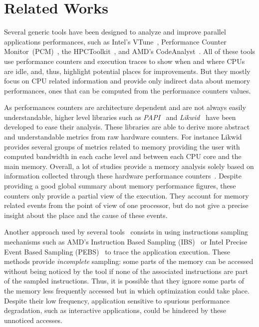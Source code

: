 
\section{Related Works}
\label{sec:related}

Several generic tools have been designed to analyze and improve parallel
applications performances, such as Intel's VTune~\cite{Reinders05VTune},
Performance Counter Monitor~(PCM)~\cite{Intel2012b}, the
HPCToolkit~\cite{Adhianto10HPCTOOLKIT}, and AMD's
CodeAnalyst~\cite{Drongowski2008}. All of these tools use performance
counters and execution traces to show when and where CPUs are idle, and, thus,
highlight potential places for improvements.
But they mostly focus on CPU related information and provide only
indirect data about memory performances, ones that can be computed from the performance counters values.

As performances counters are architecture dependent and are not always easily
understandable, higher level libraries such as \emph{PAPI}~\cite{Weaver13PAPI} and
\emph{Likwid}~\cite{Treibig10LIKWID} have been developed to ease their analysis. These
libraries are able to derive more abstract and understandable metrics from raw hardware counters.
For instance Likwid provides several groups of metrics related to memory
providing the user with computed bandwidth in each cache level and between each CPU core
and the main memory.
Overall, a lot of studies provide a memory analysis solely based
on information collected through these hardware performance counters~\cite{Majo13(Mis)understanding,
Jiang14Understanding,Bosch00Rivet,Weyers14Visualization,Tao01Visualizing,DeRose01Hardware}.
Despite providing a good global summary about memory performance figures, these counters only provide a partial view of the execution. They
account for memory related events from the point of view of one processor, but
do not give a precise insight about the place and the cause of these events.

Another approach used by several
tools~\cite{Lachaize12MemProf,McCurdy10Memphis,Liu14Tool,Gimenez14Dissecting}
consists in using instructions sampling mechanisms such as AMD's Instruction Based Sampling
(IBS)~\cite{Drongowski07Instructionbased} or Intel Precise Event Based
Sampling (PEBS)~\cite{Levinthal2009} to trace the application execution. These methods
provide \emph{incomplete} sampling: some parts of the memory can be accessed without
being noticed by the tool if none of the associated instructions are part of the sampled
instructions.
Thus, it is possible that they ignore some parts of the memory less frequently accessed but in which
optimization could take place.
Despite their low frequency, application sensitive to spurious performance degradation, such as interactive applications, could be hindered by these unnoticed
accesses.

